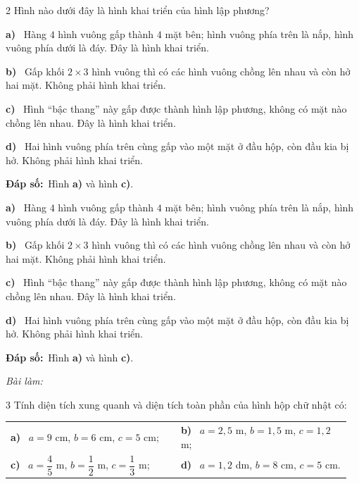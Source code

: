 \documentclass[11pt]{article}
\makeatletter
\newif\ifsol \soltrue
\renewcommand{\arraystretch}{1.35}
\providecommand{\AnsWord}{Đáp số}
\newcommand{\dapso}[1]{\par\textbf{\AnsWord:}\ #1}
\newcommand{\probsol}[1]{%
  \begin{lrbox}{\solmeasure}\begin{minipage}{\dimexpr\linewidth-24pt\relax}#1\end{minipage}\end{lrbox}%
  \ifsol
    \begin{solbox}#1\end{solbox}%
  \else
    \setlength{\solht}{\dimexpr\ht\solmeasure+\dp\solmeasure+0.85cm\relax}%
    \ifdim\solht<1.35cm\setlength{\solht}{1.35cm}\fi
    \begin{tcolorbox}[colback=white,colframe=Line,boxrule=0.8pt,arc=5pt,
      left=8pt,right=8pt,top=4pt,bottom=4pt,height=\solht]{\footnotesize\color{Slate}\itshape\WorkWord}\end{tcolorbox}%
  \fi}
\newcommand{\pa}[1]{\textbf{#1)}\ }
\newenvironment{cols2}{\par\vspace{3pt}\noindent\setlength{\tabcolsep}{0pt}\renewcommand{\arraystretch}{1.3}%
  \begin{tabular}{@{}>{\raggedright\arraybackslash\rule{0pt}{4.4ex}}p{0.48\linewidth}<{\rule[-2.3ex]{0pt}{0pt}}@{\hspace{0.03\linewidth}}>{\raggedright\arraybackslash\rule{0pt}{4.4ex}}p{0.48\linewidth}<{\rule[-2.3ex]{0pt}{0pt}}@{}}}%
  {\end{tabular}\par}
\newcommand{\gap}{\vspace{0.3cm}}
\def\WorkWord{Bài làm:}
\def\AnsWord{Đáp số}
\makeatother
\begin{document}
\gap
\begin{probbox}{2}{\relax}
Hình nào dưới đây là hình khai triển của hình lập phương?\par\smallskip
\begin{center}
\end{center}
\end{probbox}
\probsol{
\pa{a} Hàng $4$ hình vuông gấp thành $4$ mặt bên; hình vuông phía trên là nắp, hình vuông phía dưới là đáy. Đây là hình khai triển.\par
\pa{b} Gấp khối $2\times3$ hình vuông thì có các hình vuông chồng lên nhau và còn hở hai mặt. Không phải hình khai triển.\par
\pa{c} Hình ``bậc thang'' này gấp được thành hình lập phương, không có mặt nào chồng lên nhau. Đây là hình khai triển.\par
\pa{d} Hai hình vuông phía trên cùng gấp vào một mặt ở đầu hộp, còn đầu kia bị hở. Không phải hình khai triển.
\dapso{Hình \textbf{a)} và hình \textbf{c)}.}}
\gap
\begin{probbox}{3}{\relax}
Tính diện tích xung quanh và diện tích toàn phần của hình hộp chữ nhật có:
\begin{cols2}
\pa{a} $a=9$ cm, $b=6$ cm, $c=5$ cm; & \pa{b} $a=2{,}5$ m, $b=1{,}5$ m, $c=1{,}2$ m;\\
\pa{c} $a=\dfrac45$ m, $b=\dfrac12$ m, $c=\dfrac13$ m; & \pa{d} $a=1{,}2$ dm, $b=8$ cm, $c=5$ cm.
\end{cols2}
\end{probbox}
\end{document}

